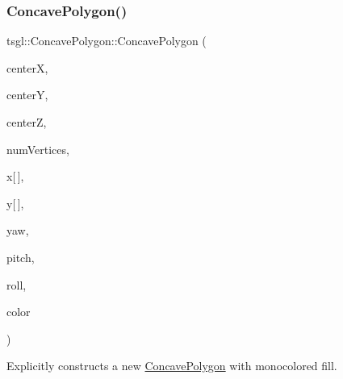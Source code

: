 \subsubsection{\texorpdfstring{Concave\+Polygon()}{ConcavePolygon()}\hspace{0.1cm}{\footnotesize\ttfamily [2/3]}}
{\footnotesize\ttfamily tsgl\+::\+Concave\+Polygon\+::\+Concave\+Polygon (\begin{DoxyParamCaption}\item[{float}]{centerX,  }\item[{float}]{centerY,  }\item[{float}]{centerZ,  }\item[{int}]{num\+Vertices,  }\item[{float}]{x\mbox{[}$\,$\mbox{]},  }\item[{float}]{y\mbox{[}$\,$\mbox{]},  }\item[{float}]{yaw,  }\item[{float}]{pitch,  }\item[{float}]{roll,  }\item[{\hyperlink{structtsgl_1_1_color_float}{Color\+Float}}]{color }\end{DoxyParamCaption})}



Explicitly constructs a new \hyperlink{classtsgl_1_1_concave_polygon}{Concave\+Polygon} with monocolored fill. 

